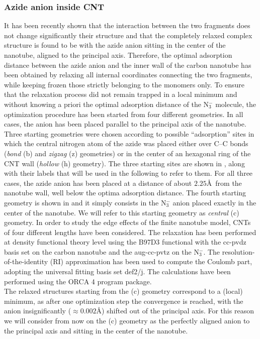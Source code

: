 \documentclass[utf8]{article}
\begin{document}
\subsubsection{Azide anion inside CNT}
It has been recently shown\cite{Battaglia2017a} that the interaction between the two fragments does not change significantly their structure and that the completely relaxed complex structure is found to be with the azide anion sitting in the center of the nanotube, aligned to the principal axis.
Therefore, the optimal adsorption distance between the azide anion and the inner wall of the carbon nanotube has been obtained by relaxing all internal coordinates connecting the two fragments, while keeping frozen those strictly belonging to the monomers only.
To ensure that the relaxation process did not remain trapped in a local minimum and without knowing a priori the optimal adsorption distance of the N$_3^-$ molecule, the optimization procedure has been started from four different geometries.
In all cases, the anion has been placed parallel to the principal axis of the nanotube.
Three starting geometries were chosen according to possible ``adsorption'' sites in which the central nitrogen atom of the azide was placed either over C--C bonds (\textit{bond} (b) and \textit{zigzag} (z) geometries) or in the center of an hexagonal ring of the CNT wall (\textit{hollow} (h) geometry). The three starting sites are shown in , along with their labels that will be used in the following to refer to them. For all three cases, the azide anion has been placed at a distance of about $2.25$\AA\ from the nanotube wall, well below the optima adsorption distance.
The fourth starting geometry is shown in  and it simply consists in the N$_3^-$ anion placed exactly in the center of the nanotube. We will refer to this starting geometry as \textit{central} (c) geometry.
In order to study the edge effects of the finite nanotube model, CNTs of four different lengths have been considered.
The relaxation has been performed at density functional theory level using the B97D3 functional with the cc-pvdz basis set on the carbon nanotube and the aug-cc-pvtz on the N$_3^-$. The resolution-of-the-identity (RI) approximation has been used to compute the Coulomb part, adopting the universal fitting basis set def2/j\cite{weigend}. The calculations have been performed using the ORCA 4 program package\cite{ORCA4}.\\
The relaxed structures starting from the (c) geometry correspond to a (local) minimum, as after one optimization step the convergence is reached, with the \ntm anion insignificantly ($\approx 0.002$\AA) shifted out of the principal axis. For this reason we will consider from now on the (c) geometry as the perfectly aligned anion to the principal axis and sitting in the center of the nanotube.
\end{document}

